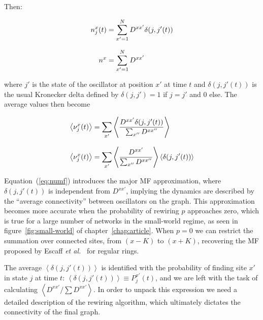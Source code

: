 \noindent Then:

\begin{align}
  n^x_j(t) &= \sum\limits_{x'=1}^ND^{xx'}\delta(j,j'(t)) \notag\\[8pt]
  n^x &= \sum\limits_{x'=1}^ND^{xx'}
\end{align}

\noindent where $j'$ is the state of the oscillator at position $x'$ at time $t$ and $\delta(j,j'(t))$ is the usual Kronecker delta
defined by $\delta(j,j')=1$ if $ j=j'$ and $0$ else. The average values then become

\begin{align}
  \left< \nu^x_j(t) \right> &= \sum_{x'} \left< \frac{D^{xx'}\delta(j,j'(t))}{\sum_{x''}D^{xx''}}
  \right> \notag \\[8pt]
  \left< \nu^x_j(t) \right> &= \sum_{x'} \left< \frac{D^{xx'}}{\sum_{x''}D^{xx''}}\right>\left<\delta(j,j'(t)) \right>
  \label{eq:numf}
\end{align}

\noindent Equation~(\ref{eq:numf}) introduces the major MF approximation, where $\delta(j,j'(t))$ is independent from $D^{xx'}$,
implying the dynamics are described by the ``average connectivity'' between oscillators on the graph. This approximation becomes more
accurate when the probability of rewiring $p$ approaches zero, which is true for a large number of networks in the small-world regime,
as seen in figure~\ref{fig:small-world} of chapter~\ref{chap:article}. When $p=0$ we can restrict the summation over connected sites,
from $(x-K)$ to $(x+K)$, recovering the MF proposed by Escaff \textit{et al.}~\cite{escaff2014arrays} for regular rings.

The average $\left< \delta(j,j'(t)) \right>$ is identified with the probability of finding site $x'$ in state $j$ at time $t$: $\left<
\delta(j,j'(t)) \right> \equiv P_j^{x'}(t)$, and we are left with the task of calculating $\left< D^{xx'}/\sum D^{xx'} \right>$. In
order to unpack this expression we need a detailed description of the rewiring algorithm, which ultimately dictates the connectivity of
the final graph.

